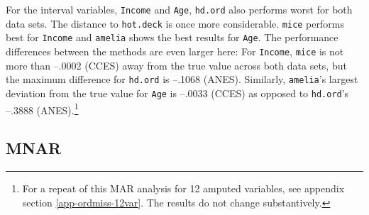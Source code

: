 \documentclass[12pt,econ]{sources/authesis}
\begin{document}
For the interval variables, \texttt{Income} and \texttt{Age}, \texttt{hd.ord} also performs worst for both data sets. The distance to \texttt{hot.deck} is once more considerable. \texttt{mice} performs best for \texttt{Income} and \texttt{amelia} shows the best results for \texttt{Age}. The performance differences between the methods are even larger here: For \texttt{Income}, \texttt{mice} is not more than --.0002 (CCES) away from the true value across both data sets, but the maximum difference for \texttt{hd.ord} is --.1068 (ANES). Similarly, \texttt{amelia}'s largest deviation from the true value for \texttt{Age} is --.0033 (CCES) as opposed to \texttt{hd.ord}'s --.3888 (ANES).\footnote{For a repeat of this MAR analysis for 12 amputed variables, see appendix section \ref{app-ordmiss-12var}. The results do not change substantively.}

\hypertarget{ordmiss-results-mnar}{%
\subsection{MNAR}\label{ordmiss-results-mnar}}
\end{document}
